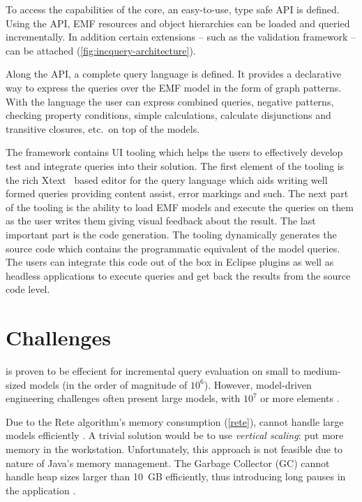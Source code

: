 To access the capabilities of the core, an easy-to-use, type safe API is
defined. Using the API, EMF resources and object hierarchies can be loaded and
queried incrementally. In addition certain extensions -- such as the validation
framework -- can be attached (\autoref{fig:incquery-architecture}).

Along the API, a complete query language is defined. It provides a declarative
way to express the queries over the EMF model in the form of graph patterns.
With the language the user can express combined queries, negative patterns,
checking property conditions, simple calculations, calculate disjunctions and
transitive closures, etc.~on top of the models.

The framework contains UI tooling which helps the users to effectively develop
test and integrate queries into their solution. The first element of the tooling
is the rich Xtext~\cite{XtextWeb} based editor for the query language which aids writing well
formed queries providing content assist, error markings and such. The next part
of the tooling is the ability to load EMF models and execute the queries on them
as the user writes them giving visual feedback about the result.
The last important part is the code generation. The tooling dynamically
generates the source code which contains the programmatic equivalent of the
model queries. The users can integrate this code out of the box in Eclipse
plugins as well as headless applications to execute queries and get back the
results from the source code level.

\section{Challenges}

\eiq{} is proven to be effecient for incremental query evaluation on small to medium-sized models (in the order of magnitude of $10^6$). However, model-driven engineering challenges often present large models, with $10^7$ or more elements \cite{Scheidgen12}. 

Due to the Rete algorithm's memory consumption (\autoref{rete}), \eiq{} cannot handle large models efficiently \cite{models10}. A trivial solution would be to use \emph{vertical scaling}: put more memory in the workstation. Unfortunately, this approach is not feasible due to nature of Java's memory management. The Garbage Collector (GC) cannot handle heap sizes larger than 10~GB efficiently, thus introducing long pauses in the application \cite{Azul}. 

